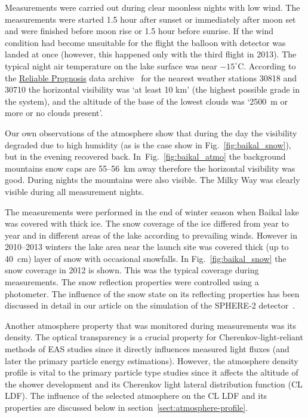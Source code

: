 \documentclass[final,5p,times,twocolumn]{elsarticle}
\begin{document}
Measurements were carried out during clear moonless nights with low wind. The measurements were started 1.5 hour after sunset or immediately after moon set and were finished before moon rise or 1.5 hour before sunrise. If the wind condition had become unsuitable for the flight the balloon with detector was landed at once (however, this happened only with the third flight in 2013). The typical night air temperature on the lake surface was near $-15^\circ$C. According to the \href{https://rp5.ru/Weather_in_the_world}{Reliable Prognosis} data archive~\cite{rp5} for the nearest weather stations 30818 and 30710 the horizontal visibility was `at least 10 km' (the highest possible grade in the system), and the altitude of the base of the lowest clouds was `2500~m or more or no clouds present'.

Our own observations of the atmosphere show that during the day the visibility degraded due to high humidity (as is the case show in Fig.~\ref{fig:baikal_snow}), but in the evening recovered back. In~Fig.~\ref{fig:baikal_atmo} the background mountains snow caps are 55--56~km away therefore the horizontal visibility was good. During nights the mountains were also visible. The Milky Way was clearly visible during all measurement nights. 

The measurements were performed in the end of winter season when Baikal lake was covered with thick ice. The snow coverage of the ice differed from year to year and in different areas of the lake according to prevailing winds. However in 2010--2013 winters the lake area near the launch site was covered thick (up to 40~cm) layer of snow with occasional snowfalls. In Fig.~\ref{fig:baikal_snow} the snow coverage in 2012 is shown. This was the typical coverage during measurements. The snow reflection properties were controlled using a photometer. The influence of the snow state on its reflecting properties has been discussed in detail in our article on the simulation of the SPHERE-2 detector~\cite{Ant19}.

Another atmosphere property that was monitored during measurements was its density. The optical transparency is a crucial property for Cherenkov-light-reliant methods of EAS studies since it directly influences measured light fluxes (and later the primary particle energy estimations). However, the atmosphere density profile is vital to the primary particle type studies since it affects the altitude of the shower development and its Cherenkov light lateral distribution function (CL LDF). The influence of the selected atmosphere on the CL LDF and its properties are discussed below in section~\ref{sect:atmosphere-profile}.
\end{document}

